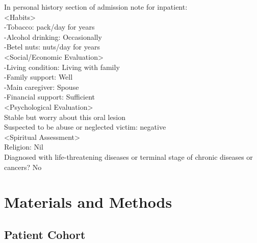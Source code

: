 \documentclass[jpm,article,submit,moreauthors,pdftex]{Definitions/mdpi}
\begin{document}
\begin{paracol}{2}
In personal history section of admission note for inpatient:\\
<Habits>\\
-Tobacco: \underline{ }\underline{ } pack/day for \underline{ }\underline{ } years\\
-Alcohol drinking: Occasionally\\
-Betel nuts: \underline{ }\underline{ } nuts/day for \underline{ }\underline{ } years\\
<Social/Economic Evaluation>\\
-Living condition: Living with family\\
-Family support: Well\\
-Main caregiver: Spouse\\
-Financial support: Sufficient\\
<Psychological Evaluation>\\
Stable but worry about this oral lesion\\
Suspected to be abuse or neglected victim: negative\\
<Spiritual Assessment>\\
Religion: Nil\\
Diagnosed with life-threatening diseases or terminal stage of chronic diseases or cancers? No


\section{Materials and Methods} %

\subsection{Patient Cohort} 


\end{paracol}
\end{document}
